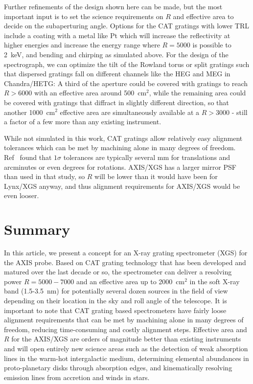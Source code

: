 \documentclass[12pt]{spieman}  %
\begin{document}
\begin{spacing}{1}
Further refinements of the design shown here can be made, but the most important input is to set the science requirements on $R$ and effective area to decide on the subaperturing angle. Options for the CAT gratings with lower TRL include a coating with a metal like Pt which will increase the reflectivity at higher energies and increase the energy range where $R=5000$ is possible to 2~keV, and bending and chirping as simulated above. For the design of the spectrograph, we can optimize the tilt of the Rowland torus or split gratings such that dispersed gratings fall on different channels like the HEG and MEG in Chandra/HETG\cite{2005PASP..117.1144C}: A third of the aperture could be covered with gratings to reach $R>6000$ with an effective area around 500~cm$^2$, while the remaining area could be covered with gratings that diffract in slightly different direction, so that another 1000~cm$^2$ effective area are simultaneously available at a $R>3000$ - still a factor of a few more than any existing instrument.

While not simulated in this work, CAT gratings allow relatively easy alignment tolerances which can be met by machining alone in many degrees of freedom. Ref~ found that $1\sigma$ tolerances are typically several mm for translations and arcminutes or even degrees for rotations. AXIS/XGS has a larger mirror PSF than used in that study, so $R$ will be lower than it would have been for Lynx/XGS\cite{10.1117/1.JATIS.5.2.021003} anyway, and thus alignment requirements for AXIS/XGS would be even looser.







\section{Summary}
In this article, we present a concept for an X-ray grating spectrometer (XGS) for the AXIS probe. Based on CAT grating technology that has been developed and matured over the last decade or so, the spectrometer can deliver a resolving power $R=5000-7000$ and an effective area up to 2000~cm$^2$ in the soft X-ray band (1.5-3.5~nm) for potentially several dozen sources in the field of view depending on their location in the sky and roll angle of the telescope. It is important to note that CAT grating based spectrometers have fairly loose alignment requirements that can be met by machining alone in many degrees of freedom\cite{10.1117/1.JATIS.5.2.021003}, reducing time-consuming and costly alignment steps. Effective area and $R$ for the AXIS/XGS are orders of magnitude better than existing instruments and will open entirely new science areas such as the detection of weak absorption lines in the warm-hot intergalactic medium, determining elemental abundances in proto-planetary disks through absorption edges, and kinematically resolving emission lines from accretion and winds in stars.


\end{spacing}
\end{document}
